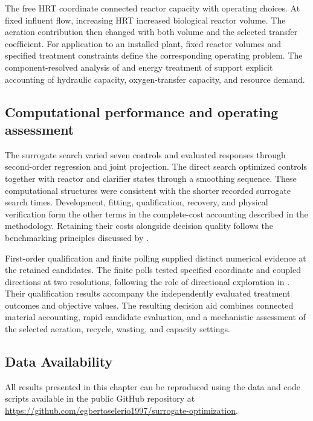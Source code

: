 The free HRT coordinate connected reactor capacity with operating choices. At fixed influent flow, increasing HRT increased biological reactor volume. The aeration contribution then changed with both volume and the selected transfer coefficient. For application to an installed plant, fixed reactor volumes and specified treatment constraints define the corresponding operating problem. The component-resolved analysis of \citet{Zhang2026} and energy treatment of \citet{Miederer2025} support explicit accounting of hydraulic capacity, oxygen-transfer capacity, and resource demand.

\subsection{Computational performance and operating assessment}

The surrogate search varied seven controls and evaluated responses through second-order regression and joint projection. The direct search optimized controls together with reactor and clarifier states through a smoothing sequence. These computational structures were consistent with the shorter recorded surrogate search times. Development, fitting, qualification, recovery, and physical verification form the other terms in the complete-cost accounting described in the methodology. Retaining their costs alongside decision quality follows the benchmarking principles discussed by \citet{Bliek2023}.

First-order qualification and finite polling supplied distinct numerical evidence at the retained candidates. The finite polls tested specified coordinate and coupled directions at two resolutions, following the role of directional exploration in \citet{AudetDennis2006}. Their qualification results accompany the independently evaluated treatment outcomes and objective values. The resulting decision aid combines connected material accounting, rapid candidate evaluation, and a mechanistic assessment of the selected aeration, recycle, wasting, and capacity settings.

\subsection{Data Availability}
\label{sec:plant_data_availability}

All results presented in this chapter can be reproduced using the data and code scripts available in the public GitHub repository at \url{https://github.com/egbertoselerio1997/surrogate-optimization}.
